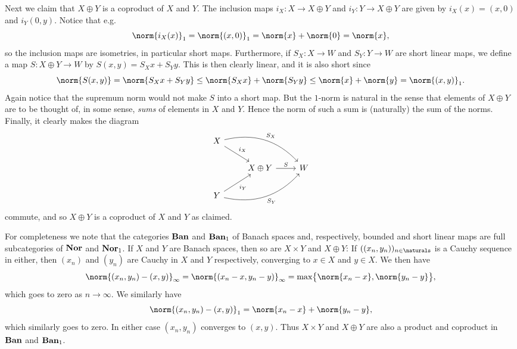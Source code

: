 \documentclass[article, a4paper, 11pt, oneside]{memoir}
\numberwithin{equation}{chapter}
\theoremstyle{nonumberplain}
\begin{document}
\begin{remarkbreak}
	Next we claim that $X \oplus Y$ is a coproduct of $X$ and $Y$. The inclusion maps $i_X \colon X \to X \oplus Y$ and $i_Y \colon Y \to X \oplus Y$ are given by $i_X(x) = (x,0)$ and $i_Y(0,y)$. Notice that e.g.
	\begin{equation*}
		\norm{i_X(x)}_1
			= \norm{(x,0)}_1
			= \norm{x} + \norm{0}
			= \norm{x},
	\end{equation*}
	so the inclusion maps are isometries, in particular short maps. Furthermore, if $S_X \colon X \to W$ and $S_Y \colon Y \to W$ are short linear maps, we define a map $S \colon X \oplus Y \to W$ by $S(x,y) = S_X x + S_Y y$. This is then clearly linear, and it is also short since
	\begin{equation*}
		\norm{S(x,y)}
			= \norm{S_X x + S_Y y}
			\leq \norm{S_X x} + \norm{S_Y y}
			\leq \norm{x} + \norm{y}
			= \norm{(x,y)}_1.
	\end{equation*}
	Again notice that the supremum norm would not make $S$ into a short map. But the $1$-norm is natural in the sense that elements of $X \oplus Y$ are to be thought of, in some sense, \emph{sums} of elements in $X$ and $Y$. Hence the norm of such a sum is (naturally) the sum of the norms. Finally, it clearly makes the diagram
	\begin{equation*}
        \begin{tikzcd}
            X
                \ar[dr, "i_X"]
                \ar[drr, "S_X", bend left] \\
            & X \oplus Y
                \ar[r, "S"]
            & W \\
            Y
                \ar[ur, "i_Y", swap]
                \ar[urr, "S_Y", bend right, swap]
        \end{tikzcd}
    \end{equation*}
	commute, and so $X \oplus Y$ is a coproduct of $X$ and $Y$ as claimed.

	For completeness we note that the categories $\mathbf{Ban}$ and $\mathbf{Ban}_1$ of Banach spaces and, respectively, bounded and short linear maps are full subcategories of $\mathbf{Nor}$ and $\mathbf{Nor}_1$. If $X$ and $Y$ are Banach spaces, then so are $X \times Y$ and $X \oplus Y$: If $((x_n,y_n))_{n\in\naturals}$ is a Cauchy sequence in either, then $(x_n)$ and $(y_n)$ are Cauchy in $X$ and $Y$ respectively, converging to $x \in X$ and $y \in X$. We then have
	\begin{equation*}
		\norm{(x_n,y_n) - (x,y)}_\infty
			= \norm{(x_n - x, y_n - y)}_\infty
			= \max \bigl\{ \norm{x_n - x}, \norm{y_n - y} \bigr\},
	\end{equation*}
	which goes to zero as $n \to \infty$. We similarly have
	\begin{equation*}
		\norm{(x_n,y_n) - (x,y)}_1
			= \norm{x_n - x} + \norm{y_n - y},
	\end{equation*}
	which similarly goes to zero. In either case $(x_n,y_n)$ converges to $(x,y)$. Thus $X \times Y$ and $X \oplus Y$ are also a product and coproduct in $\mathbf{Ban}$ and $\mathbf{Ban}_1$.
\end{remarkbreak}
\end{document}
